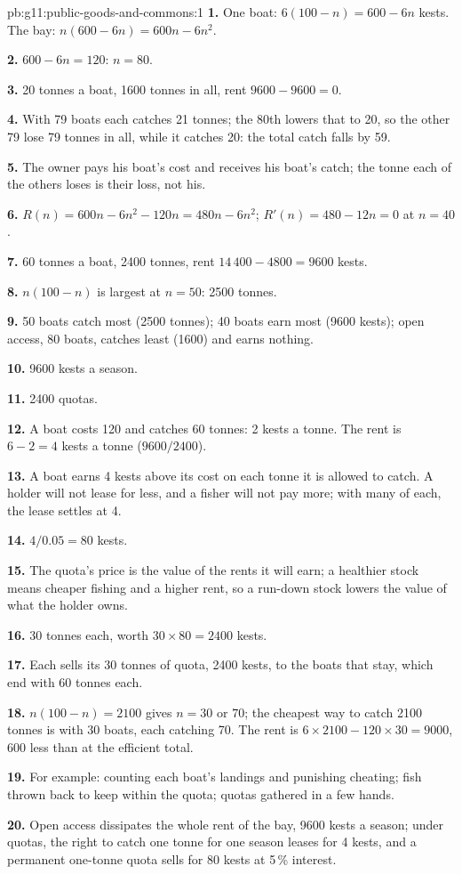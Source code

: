 \begin{solution}{pb:g11:public-goods-and-commons:1}
\textbf{1.} One boat: $6(100 - n) = 600 - 6n$ kests. The bay: $n(600 - 6n) = 600n - 6n^2$.

\textbf{2.} $600 - 6n = 120$: $n = 80$.

\textbf{3.} 20 tonnes a boat, 1600 tonnes in all, rent $9600 - 9600 = 0$.

\textbf{4.} With 79 boats each catches 21 tonnes; the 80th lowers that to 20, so the other 79 lose 79 tonnes in all, while it catches 20: the total catch falls by 59.

\textbf{5.} The owner pays his boat's cost and receives his boat's catch; the tonne each of the others loses is their loss, not his.

\textbf{6.} $R(n) = 600n - 6n^2 - 120n = 480n - 6n^2$; $R'(n) = 480 - 12n = 0$ at $n = 40$.

\textbf{7.} 60 tonnes a boat, 2400 tonnes, rent $14\,400 - 4800 = 9600$ kests.

\textbf{8.} $n(100 - n)$ is largest at $n = 50$: 2500 tonnes.

\textbf{9.} 50 boats catch most (2500 tonnes); 40 boats earn most (9600 kests); open access, 80 boats, catches least (1600) and earns nothing.

\textbf{10.} 9600 kests a season.

\textbf{11.} 2400 quotas.

\textbf{12.} A boat costs 120 and catches 60 tonnes: 2 kests a tonne. The rent is $6 - 2 = 4$ kests a tonne ($9600/2400$).

\textbf{13.} A boat earns 4 kests above its cost on each tonne it is allowed to catch. A holder will not lease for less, and a fisher will not pay more; with many of each,
the lease settles at 4.

\textbf{14.} $4/0.05 = 80$ kests.

\textbf{15.} The quota's price is the value of the rents it will earn; a healthier stock means cheaper fishing and a higher rent, so a run-down stock lowers the value of
what the holder owns.

\textbf{16.} 30 tonnes each, worth $30 \times 80 = 2400$ kests.

\textbf{17.} Each sells its 30 tonnes of quota, 2400 kests, to the boats that stay, which end with 60 tonnes each.

\textbf{18.} $n(100 - n) = 2100$ gives $n = 30$ or $70$; the cheapest way to catch 2100 tonnes is with 30 boats, each catching 70. The rent is $6 \times 2100 - 120 \times 30 = 9000$,
600 less than at the efficient total.

\textbf{19.} For example: counting each boat's landings and punishing cheating; fish thrown back to keep within the quota; quotas gathered in a few hands.

\textbf{20.} Open access dissipates the whole rent of the bay, 9600 kests a season; under quotas, the right to catch one tonne for one season leases for 4 kests, and a
permanent one-tonne quota sells for 80 kests at 5\,\% interest.
\end{solution}
